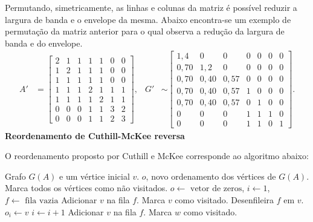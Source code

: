 \documentclass[]{beamer}
\begin{document}
\begin{frame}[t,fragile]
\begin{columns}[t]
\begin{column}{0.4\textwidth}
  Permutando, simetricamente, as linhas e colunas da matriz é possível reduzir a
  largura de banda e o envelope da mesma. Abaixo encontra-se um exemplo de
  permutação da matriz anterior para o qual observa a redução da largura de
  banda e do envelope.
  \begin{align*}
      A' &= \begin{bmatrix}
          2 & 1 & 1 & 1 & 1 & 0 & 0 \\
          1 & 2 & 1 & 1 & 1 & 0 & 0 \\
          1 & 1 & 1 & 1 & 1 & 0 & 0 \\
          1 & 1 & 1 & 2 & 1 & 1 & 1 \\
          1 & 1 & 1 & 1 & 2 & 1 & 1 \\
          0 & 0 & 0 & 1 & 1 & 3 & 2 \\
          0 & 0 & 0 & 1 & 1 & 2 & 3
      \end{bmatrix}, &
      G' &\sim \begin{bmatrix}
          1,4 & 0 & 0 & 0 & 0 & 0 & 0 \\
          0,70 & 1,2 & 0 & 0 & 0 & 0 & 0 \\
          0,70 & 0,40 & 0,57 & 0 & 0 & 0 & 0 \\
          0,70 & 0,40 & 0,57 & 1 & 0 & 0 & 0 \\
          0,70 & 0,40 & 0,57 & 0 & 1 & 0 & 0 \\
          0 & 0 & 0 & 1 & 1 & 1 & 0 \\
          0 & 0 & 0 & 1 & 1 & 0 & 1
      \end{bmatrix}.
  \end{align*}
      \textbf{Reordenamento de Cuthill-McKee reversa}

      O reordenamento proposto por Cuthill e McKee corresponde ao algoritmo
      abaixo:

  \begin{algorithmic}[1]
      \REQUIRE Grafo $G(A)$ e um vértice inicial $v$.
      \ENSURE $o$, novo ordenamento dos vértices de $G(A)$.
      \STATE Marca todos os vértices como não visitados.
      \STATE $o \longleftarrow \text{ vetor de zeros}$, $i \longleftarrow
      1$, $f \longleftarrow \text{ fila vazia}$
      \STATE Adicionar $v$ na fila $f$.
      \STATE Marca $v$ como visitado.
          \STATE Desenfileira $f$ em $v$.
          \STATE $o_i \longleftarrow v$
          \STATE $i \longleftarrow i + 1$
                  \STATE Adicionar $v$ na fila $f$.
                  \STATE Marca $w$ como visitado.
              \ENDIF
          \ENDFOR
      \ENDWHILE
  \end{algorithmic}


\end{column}
\end{columns}
\end{frame}
\end{document}
